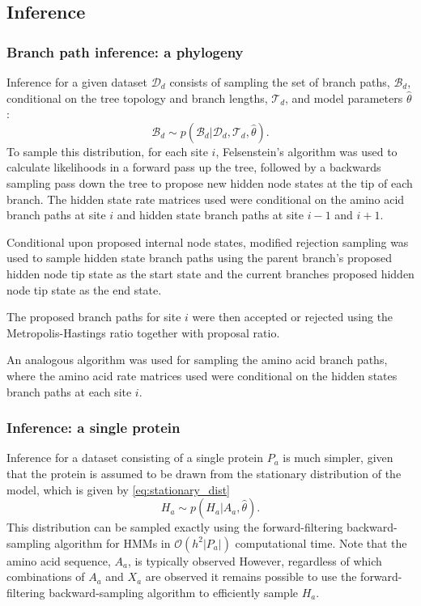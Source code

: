 \documentclass[nogrid]{MBE}%
\begin{document}
\subsection{Inference}

\subsubsection{Branch path inference: a phylogeny}
Inference for a given dataset $\mathcal{D}_{d}$ consists of sampling the set of branch paths, $\mathcal{B}_{d}$, conditional on the tree topology and branch lengths, $\mathcal{T}_{d}$, and model parameters $\hat{\theta}$:
\begin{equation}
\mathcal{B}_{d} \sim p(\mathcal{B}_{d}|\mathcal{D}_{d},\mathcal{T}_d,\hat{\theta}).
\end{equation}
To sample this distribution, for each site $i$,  Felsenstein's algorithm was used to calculate likelihoods in a forward pass up the tree, followed by a backwards sampling pass down the tree to propose new hidden node states at the tip of each branch. The hidden state rate matrices used were conditional on the amino acid branch paths at site $i$ and hidden state branch paths at site $i-1$ and $i+1$.

Conditional upon proposed internal node states, modified rejection sampling was used to sample hidden state branch paths using the parent branch's proposed hidden node tip state as the start state and the current branches proposed hidden node tip state as the end state.

The proposed branch paths for site $i$ were then accepted or rejected using the Metropolis-Hastings ratio together with proposal ratio.

An analogous algorithm was used for sampling the amino acid branch paths, where the amino acid rate matrices used were conditional on the hidden states branch paths at each site $i$.

\subsubsection{Inference: a single protein}
Inference for a dataset consisting of a single protein $P_{a}$ is much simpler, given that the protein is assumed to be drawn from the stationary distribution of the model, which is given by \eqref{eq:stationary_dist}
\begin{equation}
H_{a} \sim p(H_{a}|A_{a},\hat{\theta}).
\end{equation}
This distribution can be sampled exactly using the forward-filtering backward-sampling algorithm for HMMs \citep{fruhwirth1994data} in $\mathcal{O}(h^{2}|P_{a}|)$ computational time. Note that the amino acid sequence, $A_{a}$, is typically observed However, regardless of which combinations of $A_{a}$ and $X_{a}$ are observed it remains possible to use the forward-filtering backward-sampling algorithm to efficiently sample $H_{a}$.
\end{document}
